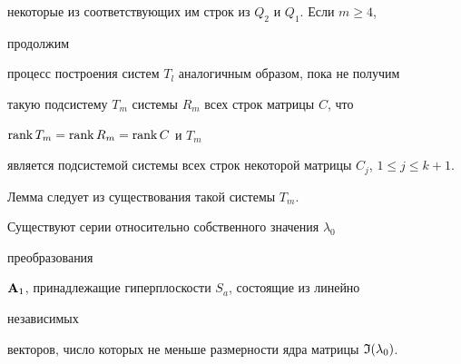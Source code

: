 \begin{pf}
некоторые из соответствующих им строк из $Q_2$ и $Q_1$. Если $m\ge4$, 


продолжим 


процесс построения систем $T_l$ аналогичным образом, пока не получим 


такую подсистему $T_m$ системы $R_m$ всех строк матрицы $C$, что 


$\operatorname{rank} T_m=\operatorname{rank} R_m=\operatorname{rank} C$ и $T_m$ 


является подсистемой системы всех строк некоторой матрицы $C_j$, $1\le 


j\le k+1$. 


Лемма следует из существования такой системы $T_m$. 


\end{pf} 


 


\begin{lem} 


Существуют серии относительно собственного значения $\lambda_0$ 


преобразования 


$\bold A_1$, принадлежащие гиперплоскости $S_a$, состоящие из линейно 


независимых 


векторов, число которых не меньше размерности ядра матрицы $\frak 


I(\lambda_0)$. 


\end{lem} 


 


